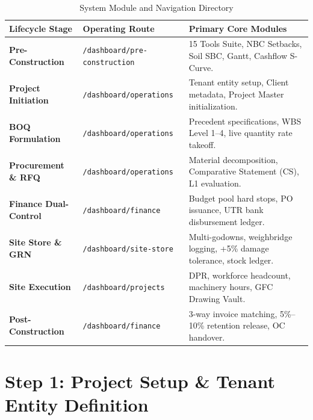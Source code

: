 \documentclass[11pt,a4paper]{article}
\begin{document}
\begin{table}[h!]
\centering
\small
\begin{tabularx}{\textwidth}{l l X}
\toprule
\textbf{Lifecycle Stage} & \textbf{Operating Route} & \textbf{Primary Core Modules} \\
\midrule
\textbf{Pre-Construction} & \texttt{/dashboard/pre-construction} & 15 Tools Suite, NBC Setbacks, Soil SBC, Gantt, Cashflow S-Curve. \\
\textbf{Project Initiation} & \texttt{/dashboard/operations} & Tenant entity setup, Client metadata, Project Master initialization. \\
\textbf{BOQ Formulation} & \texttt{/dashboard/operations} & Precedent specifications, WBS Level 1--4, live quantity rate takeoff. \\
\textbf{Procurement \& RFQ} & \texttt{/dashboard/operations} & Material decomposition, Comparative Statement (CS), L1 evaluation. \\
\textbf{Finance Dual-Control} & \texttt{/dashboard/finance} & Budget pool hard stops, PO issuance, UTR bank disbursement ledger. \\
\textbf{Site Store \& GRN} & \texttt{/dashboard/site-store} & Multi-godowns, weighbridge logging, +5\% damage tolerance, stock ledger. \\
\textbf{Site Execution} & \texttt{/dashboard/projects} & DPR, workforce headcount, machinery hours, GFC Drawing Vault. \\
\textbf{Post-Construction} & \texttt{/dashboard/finance} & 3-way invoice matching, 5\%--10\% retention release, OC handover. \\
\bottomrule
\end{tabularx}
\caption{System Module and Navigation Directory}
\end{table}

\newpage

\section{Step 1: Project Setup \& Tenant Entity Definition}
\end{document}
